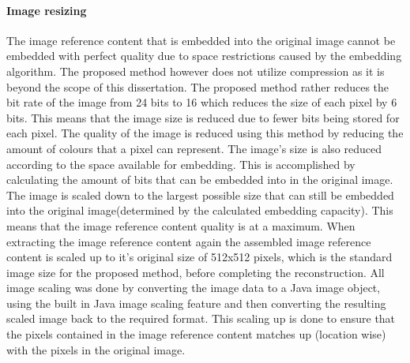 \documentclass[12pt]{article}
\begin{document}
\paragraph{Image resizing}
\label{ImageCompression}
The image reference content that is embedded into the original image cannot be embedded with perfect quality due to space restrictions caused by the embedding algorithm. 
The proposed method however does not utilize compression as it is beyond the scope of this dissertation.
The proposed method rather reduces the bit rate of the image from 24 bits to 16 which reduces the size of each pixel by 6 bits.
This means that the image size is reduced due to fewer bits being stored for each pixel.
The quality of the image is reduced using this method by reducing the amount of colours that a pixel can represent.
The image's size is also reduced according to the space available for embedding.
This is accomplished by calculating the amount of bits that can be embedded into in the original image.
The image is scaled down to the largest possible size that can still be embedded into the original image(determined by the calculated embedding capacity).
This means that the image reference content quality is at a maximum. 
When extracting the image reference content again the assembled image reference content is scaled up to it's original size of 512x512 pixels, which is the standard image size for the proposed method, before completing the reconstruction.
All image scaling was done by converting the image data to a Java image object, using the built in Java image scaling feature and then converting the resulting scaled image back to the required format.
This scaling up is done to ensure that the pixels contained in the image reference content matches up (location wise) with the pixels in the original image.
\end{document}

